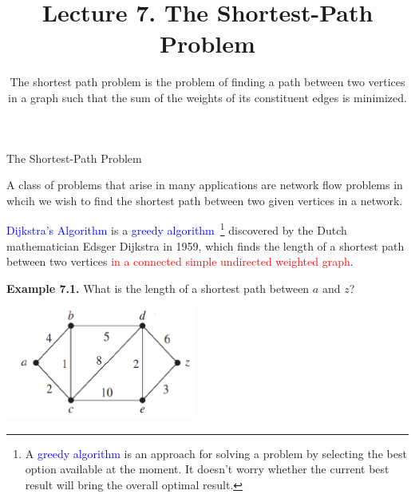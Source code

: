 \documentclass[aspectratio=169]{beamer}
\begin{document}
 

\newcommand{\Cov}{\mathrm{Cov}}
\newcommand{\Var}{\mathrm{Var}}
\newcommand{\brho}{\boldsymbol{\rho}}
\newcommand{\bSigma}{\boldsymbol{\Sigma}}
\newcommand{\btheta}{\boldsymbol{\theta}}
\newcommand{\bbeta}{\boldsymbol{\beta}}
\newcommand{\bmu}{\boldsymbol{\mu}}
\newcommand{\bW}{\mathbf{W}}
\newcommand{\one}{\mathbf{1}}
\newcommand{\bH}{\mathbf{H}}
\newcommand{\by}{\mathbf{y}}
\newcommand{\bolde}{\mathbf{e}}
\newcommand{\bx}{\mathbf{x}}

\newcommand{\cpp}[1]{\texttt{#1}}

\providecommand{\abs}[1]{\lvert#1\rvert}
\providecommand{\norm}[1]{\lVert#1\rVert}
\providecommand{\Blue}[1]{\textcolor{blue}{#1}}
\providecommand{\Red}[1]{\textcolor{red}{#1}}  
\providecommand{\Purple}[1]{\textcolor{purple}{#1}} %
\newcommand{\celsius}{\ensuremath{^\circ}C}
\newcommand\thfore{\mathord{\therefore}\,}

\title{Lecture 7. The Shortest-Path Problem 
}
\author{The shortest path problem is the problem of finding a path 
  between two vertices in a graph such that the sum of the weights of 
  its constituent edges is minimized.
}

\date{ }

\frame[plain]{\titlepage}

\begin{frame}[plain]{The Shortest-Path Problem} 

A class of problems that arise in many applications are network flow problems
in whcih we wish to find the shortest path between two given vertices in a network.
\medskip

\Blue{Dijkstra's Algorithm} is a \Blue{greedy algorithm}~\footnote{ 
  A \Blue{greedy algorithm} is an approach for solving a problem 
  by selecting the best option available at the moment. 
  It doesn't worry whether the current best result will bring the overall optimal result.
  }%
 discovered 
by the Dutch mathematician Edsger Dijkstra in 1959,
which finds the length of a shortest path between 
 two vertices \Red{in a connected simple undirected weighted graph}.
\medskip

{\bf Example 7.1.} What is the length of a shortest path between $a$ and $z$?

\begin{center}
     \includegraphics[height=3.7cm]{./img/lecture7-fig1.png}
  \end{center}
    
\end{frame}
\end{document}
